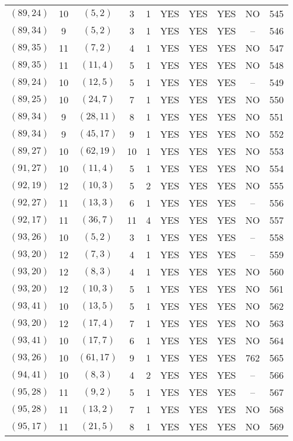 \begin{longtable}{|c|c|c|c|c|c|c|c|c|c|}
$(89, 24)$ & 10 & $(5, 2)$ & 3 & 1 & YES & YES & YES & NO & 545\\
$(89, 34)$ & 9 & $(5, 2)$ & 3 & 1 & YES & YES & YES & -- & 546\\
$(89, 35)$ & 11 & $(7, 2)$ & 4 & 1 & YES & YES & YES & NO & 547\\
$(89, 35)$ & 11 & $(11, 4)$ & 5 & 1 & YES & YES & YES & NO & 548\\
$(89, 24)$ & 10 & $(12, 5)$ & 5 & 1 & YES & YES & YES & -- & 549\\
$(89, 25)$ & 10 & $(24, 7)$ & 7 & 1 & YES & YES & YES & NO & 550\\
$(89, 34)$ & 9 & $(28, 11)$ & 8 & 1 & YES & YES & YES & NO & 551\\
$(89, 34)$ & 9 & $(45, 17)$ & 9 & 1 & YES & YES & YES & NO & 552\\
$(89, 27)$ & 10 & $(62, 19)$ & 10 & 1 & YES & YES & YES & NO & 553\\
$(91, 27)$ & 10 & $(11, 4)$ & 5 & 1 & YES & YES & YES & NO & 554\\
$(92, 19)$ & 12 & $(10, 3)$ & 5 & 2 & YES & YES & YES & NO & 555\\
$(92, 27)$ & 11 & $(13, 3)$ & 6 & 1 & YES & YES & YES & -- & 556\\
$(92, 17)$ & 11 & $(36, 7)$ & 11 & 4 & YES & YES & YES & NO & 557\\
$(93, 26)$ & 10 & $(5, 2)$ & 3 & 1 & YES & YES & YES & -- & 558\\
$(93, 20)$ & 12 & $(7, 3)$ & 4 & 1 & YES & YES & YES & -- & 559\\
$(93, 20)$ & 12 & $(8, 3)$ & 4 & 1 & YES & YES & YES & NO & 560\\
$(93, 20)$ & 12 & $(10, 3)$ & 5 & 1 & YES & YES & YES & NO & 561\\
$(93, 41)$ & 10 & $(13, 5)$ & 5 & 1 & YES & YES & YES & NO & 562\\
$(93, 20)$ & 12 & $(17, 4)$ & 7 & 1 & YES & YES & YES & NO & 563\\
$(93, 41)$ & 10 & $(17, 7)$ & 6 & 1 & YES & YES & YES & NO & 564\\
$(93, 26)$ & 10 & $(61, 17)$ & 9 & 1 & YES & YES & YES & 762 & 565\\
$(94, 41)$ & 10 & $(8, 3)$ & 4 & 2 & YES & YES & YES & -- & 566\\
$(95, 28)$ & 11 & $(9, 2)$ & 5 & 1 & YES & YES & YES & -- & 567\\
$(95, 28)$ & 11 & $(13, 2)$ & 7 & 1 & YES & YES & YES & NO & 568\\
$(95, 17)$ & 11 & $(21, 5)$ & 8 & 1 & YES & YES & YES & NO & 569\\

\end{longtable}
